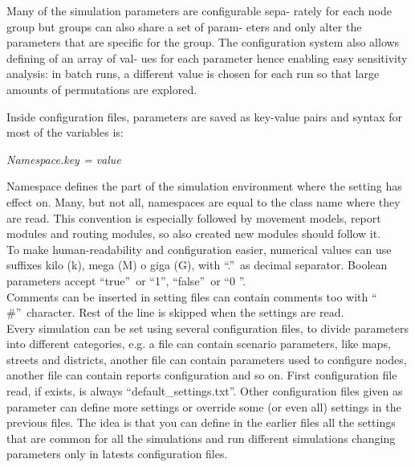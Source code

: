 Many of the simulation parameters are configurable sepa-
rately for each node group but groups can also share a set of param-
eters and only alter the parameters that are specific for the group.
The configuration system also allows defining of an array of val-
ues for each parameter hence enabling easy sensitivity analysis: in
batch runs, a different value is chosen for each run so that large
amounts of permutations are explored.

Inside configuration files, parameters are saved as key-value pairs and syntax for most of the
variables is:

\begin{center}
\textit{Namespace.key = value}
\end{center}

Namespace defines the part of the simulation environment where the setting has effect on. Many, but not all, namespaces are equal to the class name where they are read. This convention is especially followed by movement models, report modules and routing modules, so also created new modules should follow it.
\\

To make human-readability and configuration easier, numerical values can use suffixes kilo (k), mega (M) o giga (G), with \textquotedblleft .\textquotedblright \ as decimal separator. Boolean parameters accept \textquotedblleft true\textquotedblright \
 or \textquotedblleft 1\textquotedblright , \textquotedblleft false\textquotedblright \ or \textquotedblleft 0 \textquotedblright .
\\
 
Comments can be inserted in setting files can contain comments too with \textquotedblleft
\#\textquotedblright \ character. Rest of the line is skipped when the settings are read.
\\

Every simulation can be set using several configuration files, to divide parameters into different categories, e.g. a file can contain scenario parameters, like maps, streets and districts, another file can contain parameters used to configure nodes, another file can contain reports configuration and so on. First configuration file read, if exists, is always \textquotedblleft default\_settings.txt\textquotedblright. Other configuration files given as parameter can define more settings or override some (or even all) settings in the previous files. The idea is that you can define in the earlier files all the settings that are common for
all the simulations and run different simulations changing parameters only in latests configuration files.
\\

